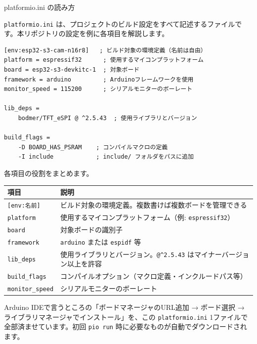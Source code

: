 \begin{qabox}{platformio.ini の読み方}

\texttt{platformio.ini} は、プロジェクトのビルド設定をすべて記述するファイルです。本リポジトリの設定を例に各項目を解説します。

\begin{lstlisting}[language={},keywordstyle={},commentstyle=\color{gray}\itshape,morecomment={[l]{;}}]
[env:esp32-s3-cam-n16r8]   ; ビルド対象の環境定義（名前は自由）
platform = espressif32      ; 使用するマイコンプラットフォーム
board = esp32-s3-devkitc-1  ; 対象ボード
framework = arduino         ; Arduinoフレームワークを使用
monitor_speed = 115200      ; シリアルモニターのボーレート

lib_deps =
    bodmer/TFT_eSPI @ ^2.5.43  ; 使用ライブラリとバージョン

build_flags =
    -D BOARD_HAS_PSRAM    ; コンパイルマクロの定義
    -I include            ; include/ フォルダをパスに追加
\end{lstlisting}

各項目の役割をまとめます。

\vspace{2mm}
\begin{tabularx}{\textwidth}{l X}
\toprule
\textbf{項目} & \textbf{説明} \\
\midrule
\texttt{[env:名前]} & ビルド対象の環境定義。複数書けば複数ボードを管理できる \\
\texttt{platform} & 使用するマイコンプラットフォーム（例: \texttt{espressif32}） \\
\texttt{board} & 対象ボードの識別子 \\
\texttt{framework} & \texttt{arduino} または \texttt{espidf} 等 \\
\texttt{lib\_deps} & 使用ライブラリとバージョン。\texttt{@\^{}2.5.43} はマイナーバージョン以上を許容 \\
\texttt{build\_flags} & コンパイルオプション（マクロ定義・インクルードパス等） \\
\texttt{monitor\_speed} & シリアルモニターのボーレート \\
\bottomrule
\end{tabularx}

\begin{notebox}
Arduino IDEで言うところの「ボードマネージャのURL追加 → ボード選択 → ライブラリマネージャでインストール」を、この \texttt{platformio.ini} 1ファイルで全部済ませています。初回 \texttt{pio run} 時に必要なものが自動でダウンロードされます。
\end{notebox}

\end{qabox}

